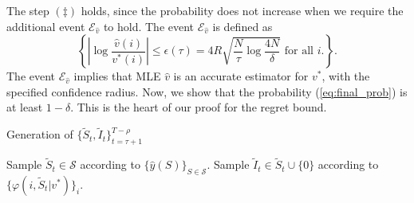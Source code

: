 \documentclass{article}
\makeatletter
\newenvironment{procedure}[1][htb]{%
    \renewcommand{\ALG@name}{Procedure}%
   \begin{algorithm}[#1]%
  }{\end{algorithm}}
\theoremstyle{definition}
\newcommand{\PPP}{\mathbb{P}}
\newcommand{\SSS}{\mathcal{S}}
\makeatother
\begin{document}
The step $(\ddagger)$ holds, since the probability does not increase when we require the additional event $\mathcal{E}_{\hat{v}}$ to hold. The event $\mathcal{E}_{\hat{v}}$ is defined as
\begin{equation}\label{eq:goodevent}
\left\{\left|\log \frac{\hat{v}(i)}{ v^*(i)}\right| \leq \epsilon(\tau) = 4 R\sqrt{\frac{N}{\tau}\log\frac{4N}{\delta}}\text{ for all $i$.} \right\}.
\end{equation}
The event $\mathcal{E}_{\hat{v}}$ implies that MLE $\hat{v}$ is an accurate estimator for $v^*$, with the specified confidence radius. Now, we show that the probability (\ref{eq:final_prob}) is at least $1-\delta$. This is the heart of our proof for the regret bound.


\begin{procedure}[t]
\caption{Generation of $\{\tilde{S}_t, \tilde{I}_t\}^{T-\rho}_{t=\tau + 1}$}\label{alg:tildesimple}
\begin{algorithmic}[1]
\State Sample $\tilde{S}_t\in\SSS$ according to  $\{\hat{y}(S)\}_{S\in\SSS}$.
\State Sample $\tilde{I}_t\in \tilde{S}_t\cup \{0\}$ according to $\{\varphi(i, \tilde{S}_t | v^*)\}_i$.
\EndFor
\end{algorithmic}
\end{procedure}
\end{document}
